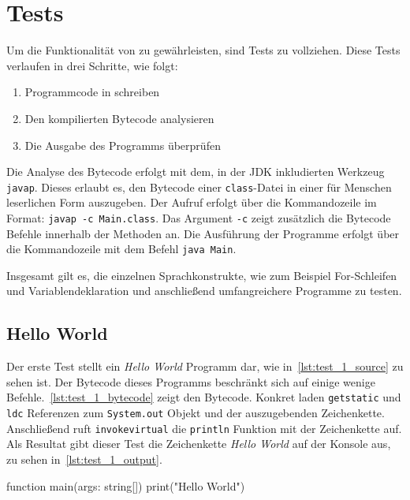 \chapter{Tests}
\label{cha:tests}

Um die Funktionalität von \toya zu gewährleisten, sind Tests zu vollziehen. Diese Tests verlaufen in drei Schritte, wie folgt:
\begin{enumerate}
    \item Programmcode in \toya schreiben
    \item Den kompilierten Bytecode analysieren
    \item Die Ausgabe des Programms überprüfen
\end{enumerate}

Die Analyse des Bytecode erfolgt mit dem, in der JDK inkludierten Werkzeug \texttt{javap}. Dieses erlaubt es, den Bytecode einer \texttt{class}-Datei in einer für Menschen leserlichen Form auszugeben. Der Aufruf erfolgt über die Kommandozeile im Format: \texttt{javap -c Main.class}. Das Argument \texttt{-c} zeigt zusätzlich die Bytecode Befehle innerhalb der Methoden an. Die Ausführung der Programme erfolgt über die Kommandozeile mit dem Befehl \texttt{java Main}.

Insgesamt gilt es, die einzelnen Sprachkonstrukte, wie zum Beispiel For-Schleifen und Variablendeklaration und anschließend umfangreichere Programme zu testen.

\section{Hello World}

Der erste Test stellt ein \textit{Hello World} Programm dar, wie in~\autoref{lst:test_1_source} zu sehen ist. Der Bytecode dieses Programms beschränkt sich auf einige wenige Befehle.~\autoref{lst:test_1_bytecode} zeigt den Bytecode. Konkret laden \texttt{getstatic} und \texttt{ldc} Referenzen zum \texttt{System.out} Objekt und der auszugebenden Zeichenkette. Anschließend ruft \texttt{invokevirtual} die \texttt{println} Funktion mit der Zeichenkette auf. Als Resultat gibt dieser Test die Zeichenkette \textit{Hello World} auf der Konsole aus, zu sehen in~\autoref{lst:test_1_output}.

\begin{ToyaCode}[numbers=none, caption={Quelltext des Hello World Programms},label=lst:test_1_source]
function main(args: string[]) {
    print("Hello World")
}
\end{ToyaCode}

